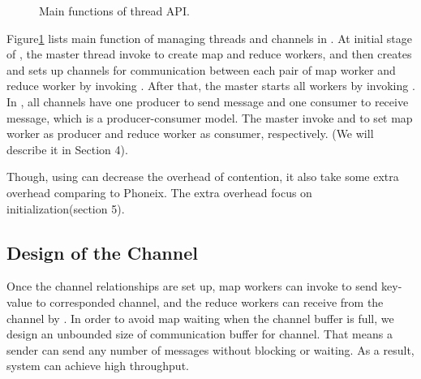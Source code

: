\label{sec:pm:thread}
\begin{figure}[htpb]

\caption{Main functions of \myds thread API.}
\label{fig:api:thread}
\end{figure}

Figure\ref{fig:api:thread} lists main function of managing threads and channels in \myth.
At initial stage of \myds, the master thread invoke 
 to create map and reduce workers, 
and then creates and sets up channels for communication between each pair of map worker and reduce worker by invoking .
After that, the master starts all workers by invoking .
In \myds, all channels have one producer 
to send message and one consumer to receive message, 
which is a producer-consumer model.
The master invoke  and  
to set map worker as producer and reduce worker as consumer, respectively.
(We will describe it in Section 4). 

Though, using \myth can decrease the overhead of contention,
it also take some extra overhead comparing to Phoneix. 
The extra overhead focus on initialization(section 5). 


\subsection{Design of the Channel}
Once the channel relationships are set up, 
map workers can invoke  to send key-value to corresponded channel,
and the reduce workers can receive from the channel by .
In order to avoid map waiting when the channel buffer is full,
we design an unbounded size of communication buffer for channel.
That means a sender can send any number of messages without blocking or waiting.
As a result, system can achieve high throughput.


